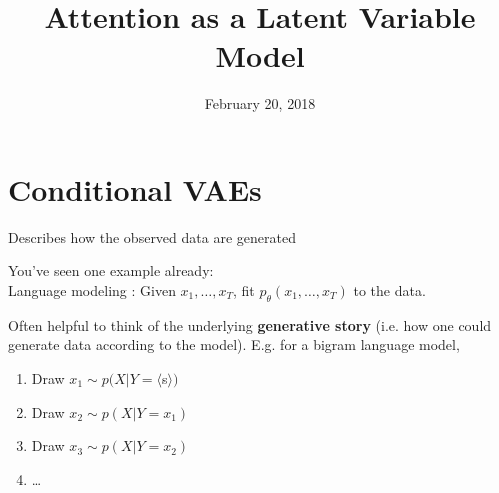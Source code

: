 \documentclass{beamer}
\title[latent]{Attention as a Latent Variable Model}
\author[Yoon Kim]{February 20, 2018}
\institute[Harvard SEAS]{ 
{ }


}
\date{}
\let\tempone\itemize
\let\temptwo\enditemize
\renewenvironment{itemize}{\tempone\addtolength{\itemsep}{0.5\baselineskip}}{\temptwo}
\newcommand{\xvec}{\mathbf{x}}
\begin{document}
\begin{frame}
  \titlepage
\end{frame}

\begin{frame}
  \tableofcontents
\end{frame}
\section{Conditional VAEs}

\begin{frame}
  \begin{center}
   \end{center} 
   \begin{itemize}   
   \item Describes how the observed data are generated
   \item You've seen one example already: \\
  Language modeling : Given $x_1, \dots, x_T$, fit $p_\theta(x_1, \dots, x_T)$ to the data.
   \end{itemize}
\end{frame}

\begin{frame}
  \begin{center}
   \end{center}
Often helpful to think of the underlying \textbf{generative story} (i.e. how one could generate data according to the model). E.g. for a bigram language model,
\begin{enumerate}
\item Draw $x_1 \sim p(X | Y = \langle$s$\rangle)$
\item Draw $x_2 \sim p(X| Y = x_1)$
\item Draw $x_3 \sim p(X| Y = x_2)$
\item \dots
\end{enumerate}

\end{frame}
\end{document}
